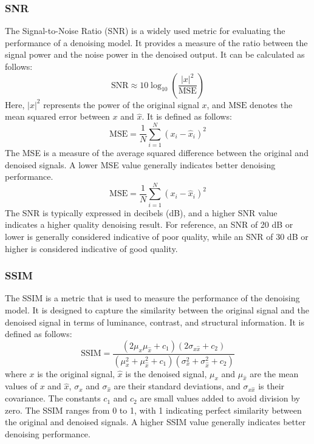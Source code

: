 \documentclass[a4paper, noexaminfo]{sapthesis}
\begin{document}
\subsubsection{SNR}
The Signal-to-Noise Ratio (SNR) is a widely used metric for 
evaluating the performance of a denoising model. It provides a 
measure of the ratio between the signal power and the noise power 
in the denoised output. It can be calculated as follows:
\begin{equation}
\text{SNR} \approx 10 \log_{10} \left(\frac{{|x|^2}}{{\text{MSE}}}\right)
\end{equation}
Here, $|x|^2$ represents the power of the original signal $x$, 
and $\text{MSE}$ denotes the mean squared error between $x$ and $\hat{x}$.
 It is defined as follows:
\begin{equation}
\text{MSE} = \frac{1}{N}\sum_{i=1}^{N} (x_i - \hat{x}_i)^2
\end{equation}
The MSE is a
measure of the average squared difference between the original
and denoised signals. A lower MSE value generally indicates
better denoising performance.
\begin{equation}
\text{MSE} = \frac{1}{N}\sum_{i=1}^{N} (x_i - \hat{x}_i)^2
\end{equation}
The SNR is typically expressed in decibels (dB), and a higher SNR value 
indicates a higher quality denoising result. For reference, an SNR of 
20 dB or lower is generally considered indicative of poor quality, 
while an SNR of 30 dB or higher is considered indicative of good quality.
\subsubsection{SSIM}
The SSIM is a metric that is used to measure the performance of the
denoising model. It is designed to capture the similarity between the 
original signal and the denoised signal in terms of luminance, 
contrast, and structural information. It is defined as follows:
\begin{equation}
\text{SSIM} = \frac{(2\mu_x\mu_{\hat{x}} + c_1)(2\sigma_{x {\hat{x}}} + c_2)}{(\mu_x^2 + \mu_{\hat{x}}^2 + c_1)(\sigma_x^2 + \sigma_{\hat{x}}^2 + c_2)}
\end{equation}
where $x$ is the original signal, $\hat{x}$ is the denoised signal, 
$\mu_x$ and $\mu_{\hat{x}}$ are the mean values of $x$ and $\hat{x}$, 
$\sigma_x$ and $\sigma_{\hat{x}}$ are their standard deviations, and 
$\sigma_{x\hat{x}}$ is their covariance. The constants $c_1$ and $c_2$ 
are small values added to avoid division by zero.\newline
The SSIM ranges from 0 to 1, with 1 indicating perfect similarity between 
the original and denoised signals. A higher SSIM value generally indicates 
better denoising performance.
\end{document}
